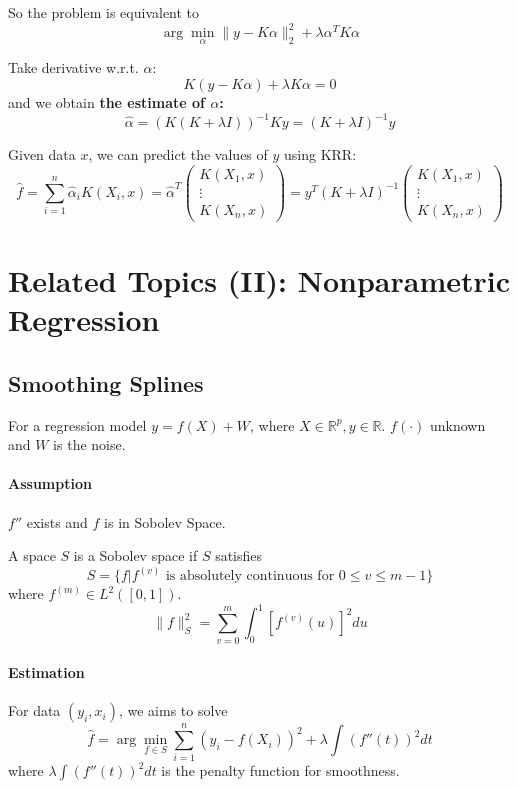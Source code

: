 \documentclass[12pt]{book}
\theoremstyle{definition}
\theoremstyle{remark}
\newcommand{\R}{\mathbb{R}}
\begin{document}
So the problem is equivalent to 
\[\arg\underset{\alpha}{\min}\|y-K\alpha\|_2^2+\lambda\alpha^TK\alpha\]

Take derivative w.r.t. $\alpha$:\\
\[K(y-K\alpha)+\lambda K\alpha = 0\]
and we obtain \textbf{the estimate of $\alpha$:}
\[\hat{\alpha} = (K(K+\lambda I))^{-1}Ky = (K+\lambda I)^{-1}y\]




Given data $x$, we can predict the values of $y$ using KRR:
\[\hat{f} = \sum_{i=1}^n\hat{\alpha}_iK(X_i,x) = \hat{\alpha}^T\begin{pmatrix}
K(X_1,x) \\
\vdots \\
K(X_n,x)
\end{pmatrix} = y^T(K+\lambda I)^{-1}\begin{pmatrix}
K(X_1,x) \\
\vdots \\
K(X_n,x)
\end{pmatrix}\]

\newpage
\section{Related Topics (II): Nonparametric Regression}
\subsection{Smoothing Splines}
For a regression model $y = f(X)+W$, where $X\in\R^p,y \in \R$. $f(\cdot)$ unknown and $W$ is the noise.\\

\paragraph{Assumption}
$f''$ exists and $f$ is in Sobolev Space. 

\begin{notionbox}
    A space $S$ is a Sobolev space if $S$ satisfies
    \[S= \{f|f^{(v)} \text{ is absolutely continuous for } 0\le v\le m-1 \}\]
    where $f^{(m)} \in L^2([0,1])$. 
    \[\|f\|_S^2 = \sum_{v=0}^m\int_0^1 [f^{(v)}(u)]^2du\]
\end{notionbox}

\paragraph{Estimation}
For data $(y_i,x_i)$, we aims to solve
\[\hat{f} = \arg\underset{f\in S}{\min}\sum_{i=1}^n(y_i-  f(X_i))^2+\lambda \int (f''(t))^2dt\]
where $\lambda \int (f''(t))^2dt$ is the penalty function for smoothness. \\
\end{document}
